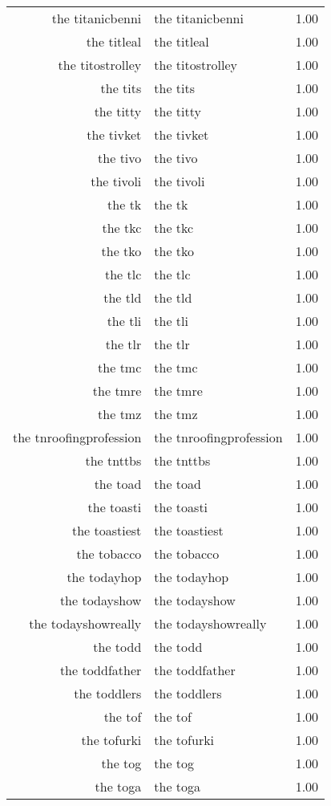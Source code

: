 \begin{table}[ht]
\begin{tabular}{rlr}
  the titanicbenni & the titanicbenni & 1.00 \\ 
  the titleal & the titleal & 1.00 \\ 
  the titostrolley & the titostrolley & 1.00 \\ 
  the tits & the tits & 1.00 \\ 
  the titty & the titty & 1.00 \\ 
  the tivket & the tivket & 1.00 \\ 
  the tivo & the tivo & 1.00 \\ 
  the tivoli & the tivoli & 1.00 \\ 
  the tk & the tk & 1.00 \\ 
  the tkc & the tkc & 1.00 \\ 
  the tko & the tko & 1.00 \\ 
  the tlc & the tlc & 1.00 \\ 
  the tld & the tld & 1.00 \\ 
  the tli & the tli & 1.00 \\ 
  the tlr & the tlr & 1.00 \\ 
  the tmc & the tmc & 1.00 \\ 
  the tmre & the tmre & 1.00 \\ 
  the tmz & the tmz & 1.00 \\ 
  the tnroofingprofession & the tnroofingprofession & 1.00 \\ 
  the tnttbs & the tnttbs & 1.00 \\ 
  the toad & the toad & 1.00 \\ 
  the toasti & the toasti & 1.00 \\ 
  the toastiest & the toastiest & 1.00 \\ 
  the tobacco & the tobacco & 1.00 \\ 
  the todayhop & the todayhop & 1.00 \\ 
  the todayshow & the todayshow & 1.00 \\ 
  the todayshowreally & the todayshowreally & 1.00 \\ 
  the todd & the todd & 1.00 \\ 
  the toddfather & the toddfather & 1.00 \\ 
  the toddlers & the toddlers & 1.00 \\ 
  the tof & the tof & 1.00 \\ 
  the tofurki & the tofurki & 1.00 \\ 
  the tog & the tog & 1.00 \\ 
  the toga & the toga & 1.00 \\ 

\end{tabular}
\end{table}
